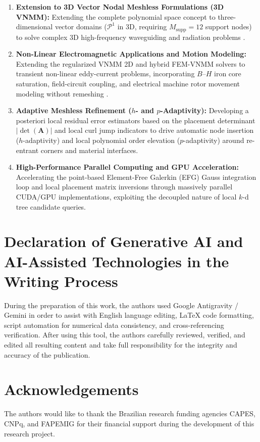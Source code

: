 \documentclass[preprint,12pt]{elsarticle}
\begin{document}
\begin{enumerate}
    \item \textbf{Extension to 3D Vector Nodal Meshless Formulations (3D VNMM):} 
    Extending the complete polynomial space concept to three-dimensional vector domains ($\mathcal{P}^1$ in 3D, requiring $M_{\mathrm{supp}} = 12$ support nodes) to solve complex 3D high-frequency waveguiding and radiation problems \cite{goncalves2023vector}.

    \item \textbf{Non-Linear Electromagnetic Applications and Motion Modeling:} Extending the regularized VNMM 2D and hybrid FEM-VNMM solvers to transient non-linear eddy-current problems, incorporating $B\text{--}H$ iron core saturation, field-circuit coupling, and electrical machine rotor movement modeling without remeshing \cite{tsukerman1992overlapping, coppoli2012induction}.

    \item \textbf{Adaptive Meshless Refinement ($h$- and $p$-Adaptivity):} 
    Developing a posteriori local residual error estimators based on the placement determinant $|\det(\mathbf{A})|$ and local curl jump indicators to drive automatic node insertion ($h$-adaptivity) and local polynomial order elevation ($p$-adaptivity) around re-entrant corners and material interfaces.

    \item \textbf{High-Performance Parallel Computing and GPU Acceleration:} 
    Accelerating the point-based Element-Free Galerkin (EFG) Gauss integration loop and local placement matrix inversions through massively parallel CUDA/GPU implementations, exploiting the decoupled nature of local $k$-d tree candidate queries.
\end{enumerate}


\section*{Declaration of Generative AI and AI-Assisted Technologies in the Writing Process}
During the preparation of this work, the authors used Google Antigravity / Gemini in order to assist with English language editing, LaTeX code formatting, script automation for numerical data consistency, and cross-referencing verification. After using this tool, the authors carefully reviewed, verified, and edited all resulting content and take full responsibility for the integrity and accuracy of the publication.


\section*{Acknowledgements}
The authors would like to thank the Brazilian research funding agencies CAPES, CNPq, and FAPEMIG for their financial support during the development of this research project.



\end{document}
